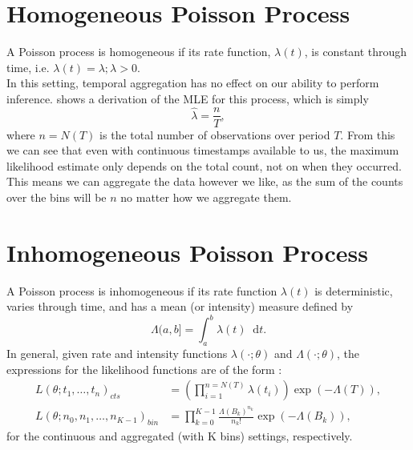 \documentclass[11pt,a4,twosided,singlespacing,titlepagenumber=on,numbers=endperiod]{scrreprt}
\numberwithin{equation}{chapter} %
\theoremstyle{remark}
\newcommand*{\diff}{\mathop{}\!\mathrm{d}}  %
\begin{document}
\section{Homogeneous Poisson Process}
A Poisson process is homogeneous if its rate function, $\lambda(t)$, is constant through time, i.e. $\lambda(t) = \lambda; \lambda > 0$. \\
In this setting, temporal aggregation has no effect on our ability to perform inference. \cite{rasmussen} shows a derivation of the MLE for this process, which is simply
\begin{equation*}
	\hat{\lambda} = \frac{n}{T},
\end{equation*}
where $n=N(T)$ is the total number of observations over period $T$. From this we can see that even with continuous timestamps available to us, the maximum likelihood estimate only depends on the total count, not on when they occurred. This means we can aggregate the data however we like, as the sum of the counts over the bins will be $n$ no matter how we aggregate them.
\newpage
\section{Inhomogeneous Poisson Process}
A Poisson process is inhomogeneous if its rate function $\lambda(t)$ is deterministic, varies through time, and has a mean (or intensity) measure defined by
\begin{equation*}
	\Lambda(a, b] = \int_a^b \lambda(t) \diff t.
\end{equation*}
In general, given rate and intensity functions $\lambda(\cdot; \theta)$ and $\Lambda(\cdot; \theta)$, the expressions for the likelihood functions are of the form \cite{daley_point_processes}:
\begin{equation*}
	\begin{aligned}
		L(\theta; t_1, \dots, t_n)_{cts} &= \left( \prod_{i=1}^{n=N(T)} \lambda(t_i) \right) \exp (- \Lambda(T)), \\
		L(\theta; n_0, n_1, \dots, n_{K-1})_{bin} &= \prod_{k=0}^{K-1} \frac{\Lambda(B_k)^{n_k}}{n_k!} \exp(-\Lambda(B_k)),
	\end{aligned}
\end{equation*}
for the continuous and aggregated (with K bins) settings, respectively.
\end{document}
